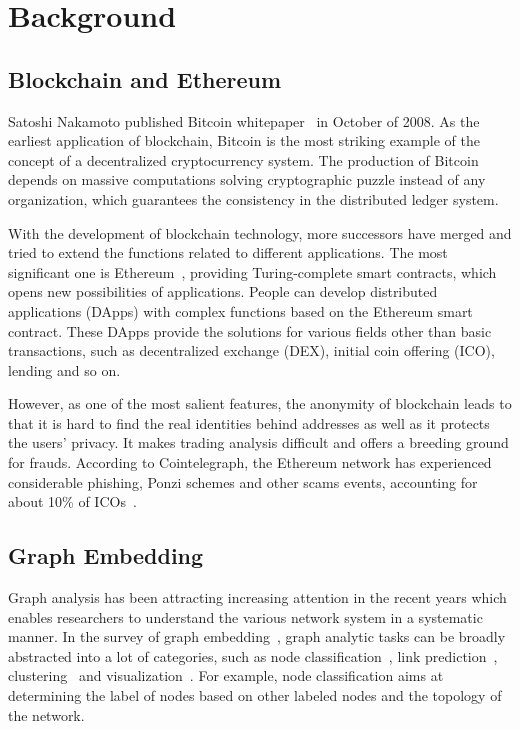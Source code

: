 
\section{Background}
\subsection{Blockchain and Ethereum}
Satoshi Nakamoto published Bitcoin whitepaper~\cite{Nakamoto2008} in October of 2008. As the earliest application of blockchain, Bitcoin is the most striking example of the concept of a decentralized cryptocurrency system. The production of Bitcoin depends on massive computations solving cryptographic puzzle instead of any organization, which guarantees the consistency in the distributed ledger system.

With the development of blockchain technology, more successors have merged and tried to extend the functions related to different applications. The most significant one is Ethereum~\cite{buterin2013ethereum}, providing Turing-complete smart contracts, which opens new possibilities of applications. People can develop distributed applications (DApps) with complex functions based on the Ethereum smart contract. These DApps provide the solutions for various fields other than basic transactions, such as decentralized exchange (DEX), initial coin offering (ICO), lending and so on.

However, as one of the most salient features, the anonymity of blockchain leads to that it is hard to find the real identities behind addresses as well as it protects the users' privacy. It makes trading analysis difficult and offers a breeding ground for frauds. According to Cointelegraph, the Ethereum network has experienced considerable phishing, Ponzi schemes and other scams events, accounting for about 10\% of ICOs~\cite{cerchiello2018icos}.

\subsection{Graph Embedding}
Graph analysis has been attracting increasing attention in the recent years which enables researchers to understand the various network system in a systematic manner. In the survey of graph embedding~\cite{cai2018comprehensive}, graph analytic tasks can be broadly abstracted into a lot of categories, such as node classification~\cite{bhagat2011node}, link prediction~\cite{liben2007link}, clustering~\cite{ding2001min} and visualization~\cite{maaten2008visualizing}. For example, node classification aims at determining the label of nodes based on other labeled nodes and the topology of the network.


